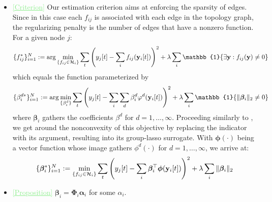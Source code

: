 \documentclass[10pt,final,onecolumn]{IEEEtran}
\newcommand{\cmt}[1]{\noindent\textcolor{lightgreen}{\underline{[#1]}}} %
\newenvironment{myitemize}{\begin{itemize}}{\end{itemize}}
\newcommand{\cmt}[1]{} %
\newenvironment{myitemize}{}{}
\begin{document}
\begin{myitemize}
{\begin{equation}
\end{equation}
}
\item \cmt{Criterion}
Our estimation criterion aims at enforcing the sparsity of edges. Since in this case each $f_{ij}$ is associated with each edge in the topology graph, the regularizing penalty is the number of edges that have a nonzero function. For a given node $j$:
\begin{equation}
    \{f^*_{ij}\}_{i=1}^N := \arg\min_{\{f_{ij} \in \mathcal{H}_i\}} \sum_t \left( y_j[t] - \sum_i f_{ij}(\bby_i[t]) \right)^2 + \lambda \sum_i \mathbb{1}\{\exists \bby: f_{ij}(\bby) \neq 0\}
\end{equation}
which equals the function parameterized by
\begin{equation}
    \{\beta_i^{d*}\}_{i=1}^N := \arg\min_{\{\beta_i^d\}} \sum_t \left( y_j[t] - \sum_i \sum_d \beta_i^d \varphi^d(\bby_i[t]) \right)^2 + \lambda \sum_i \mathbb{1}\{\| \boldsymbol{\beta}_i \|_2 \neq 0\}
\end{equation}
where $\boldsymbol{\beta}_i$ gathers the coefficients $\beta^d$ for $d=1, \ldots, \infty$.
Proceeding similarly to \cite{zaman2017online}, we get around the nonconvexity of this objective by replacing the indicator with its argument, resulting into its group-lasso surrogate. With $\boldsymbol{\phi}(\cdot)$ being a vector function whose image gathers $\phi^d(\cdot)$ for $d=1, \ldots, \infty$, we arrive at:
\begin{equation}
    \{\boldsymbol{\beta}^*_i\}_{i=1}^N := \min_{\{f_{ij} \in \mathcal{H}_i\}} \sum_t \left( y_j[t] - \sum_i \boldsymbol{\beta}_i^\top \boldsymbol\phi({\mathbf y}_i[t]) \right)^2 + \lambda \sum_i \| \boldsymbol{\beta}_i \|_2
\end{equation}
\item\cmt{Proposition} $\boldsymbol{\beta}_i = \boldsymbol{\Phi}_i\boldsymbol{\alpha}_i$ for some $\alpha_i$.
\end{myitemize}

%



\if{} 
\onecolumn
\printbibliography
\else

\fi
\end{document}
